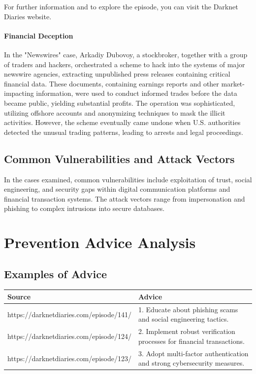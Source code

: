\documentclass[11pt]{article}
\begin{document}
For further information and to explore the episode, you can visit the Darknet Diaries website.
\paragraph*{Financial Deception}
In the "Newswires" case, Arkadiy Dubovoy, a stockbroker, together with a group of traders and hackers, orchestrated a scheme to hack into the systems of major newswire agencies, extracting unpublished press releases containing critical financial data. These documents, containing earnings reports and other market-impacting information, were used to conduct informed trades before the data became public, yielding substantial profits. The operation was sophisticated, utilizing offshore accounts and anonymizing techniques to mask the illicit activities. However, the scheme eventually came undone when U.S. authorities detected the unusual trading patterns, leading to arrests and legal proceedings.

\subsection{Common Vulnerabilities and Attack Vectors}
In the cases examined, common vulnerabilities include exploitation of trust, social engineering, and security gaps within digital communication platforms and financial transaction systems. The attack vectors range from impersonation and phishing to complex intrusions into secure databases.

\section{Prevention Advice Analysis}
\subsection{Examples of Advice}
\begin{tabular}{@{}ll@{}}
\toprule
\textbf{Source} & \textbf{Advice} \\ \midrule
https://darknetdiaries.com/episode/141/ & 1. Educate about phishing scams and social engineering tactics. \\ 
https://darknetdiaries.com/episode/124/ & 2. Implement robust verification processes for financial transactions. \\
https://darknetdiaries.com/episode/123/ & 3. Adopt multi-factor authentication and strong cybersecurity measures. \\
\bottomrule
\end{tabular}
\end{document}
